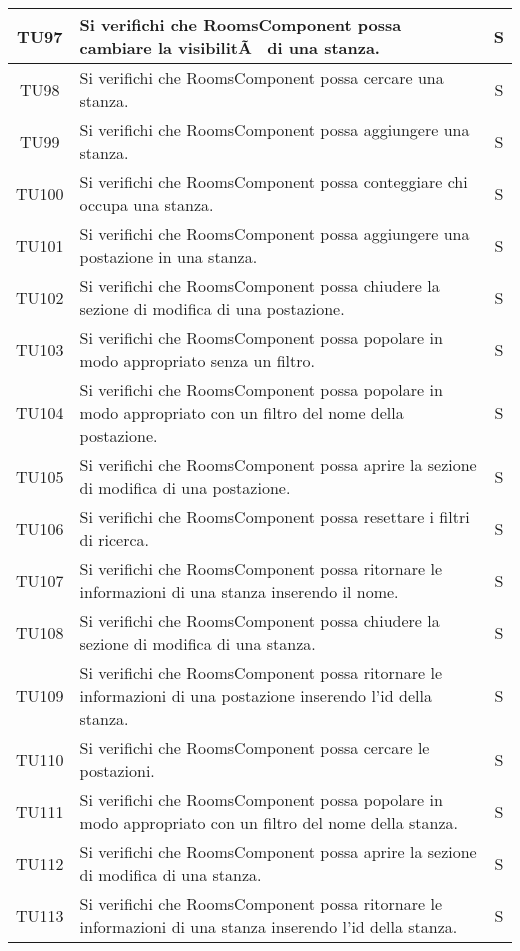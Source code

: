 \begin{center}
\begin{longtable}{|c|p{10cm}|c|}
			TU97 & Si verifichi che RoomsComponent possa cambiare la visibilitÃ  di una stanza. & S \\
			\hline
			TU98 & Si verifichi che RoomsComponent possa cercare una stanza. & S \\
			\hline		  
			TU99 & Si verifichi che RoomsComponent possa aggiungere una stanza. & S \\
			\hline
			TU100 & Si verifichi che RoomsComponent possa conteggiare chi occupa una stanza. & S \\
			\hline
			TU101 & Si verifichi che RoomsComponent possa aggiungere una postazione in una stanza. & S \\
			\hline
			TU102 & Si verifichi che RoomsComponent possa chiudere la sezione di modifica di una postazione. & S \\
			\hline
			TU103 & Si verifichi che RoomsComponent possa popolare in modo appropriato senza un filtro. & S \\
			\hline		  
			TU104 & Si verifichi che RoomsComponent possa popolare in modo appropriato con un filtro del nome della postazione. & S \\
			\hline
			TU105 & Si verifichi che RoomsComponent possa aprire la sezione di modifica di una postazione. & S \\
			\hline
			TU106 & Si verifichi che RoomsComponent possa resettare i filtri di ricerca. & S \\
			\hline
			TU107 & Si verifichi che RoomsComponent possa ritornare le informazioni di una stanza inserendo il nome. & S \\
			\hline
			TU108 & Si verifichi che RoomsComponent possa chiudere la sezione di modifica di una stanza. & S \\
			\hline	  
			TU109 & Si verifichi che RoomsComponent possa ritornare le informazioni di una postazione inserendo l'id della stanza. & S \\
			\hline
			TU110 & Si verifichi che RoomsComponent possa cercare le postazioni. & S \\
			\hline
			TU111 & Si verifichi che RoomsComponent possa popolare in modo appropriato con un filtro del nome della stanza. & S \\
			\hline
			TU112 & Si verifichi che RoomsComponent possa aprire la sezione di modifica di una stanza. & S \\
			\hline
			TU113 & Si verifichi che RoomsComponent possa ritornare le informazioni di una stanza inserendo l'id della stanza. & S \\
			\hline
			

\end{longtable}
\end{center}

